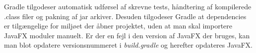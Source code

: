 Gradle tilgodeser automatisk udførsel af skrevne tests, håndtering af kompilerede .class filer og pakning af jar arkiver. Desuden tilgodeser Gradle at dependencies er tilgængelige for miljøet der åbner projektet, uden at man skal importere JavaFX moduler manuelt. Er der en fejl i den version af JavaFX der bruges, kan man blot opdatere versionsnummeret i \emph{build.gradle} og herefter opdateres JavaFX.

